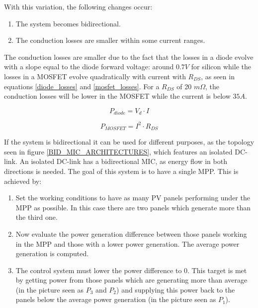 
\noindent With this variation, the following changes occur:
		
\begin{enumerate}
	\item The system becomes bidirectional.
	\item The conduction losses are smaller within some current ranges. 
\end{enumerate}

The conduction losses are smaller due to the fact that the losses in a diode evolve with a slope equal to the diode forward voltage: around $0.7V$ for silicon while the losses in a MOSFET evolve quadratically with current with $R_{DS}$, as seen in equations \ref{diode_losses} and \ref{mosfet_losses}. For a $R_{DS}$ of 20 $m\Omega$, the conduction losses will be lower in the MOSFET while the current is below $35 A$. 

\begin{equation}	\label{diode_losses}
	P_{diode} = V_d \cdot I
\end{equation}
	
\begin{equation}	\label{mosfet_losses}
	P_{MOSFET} = I^2 \cdot R_{DS}
\end{equation}


If the system is bidirectional it can be used for different purposes, as the topology seen in figure \ref{BID_MIC_ARCHITECTURES}, which features an isolated DC-link. 
An isolated DC-link has a bidirectional MIC, as energy flow in both directions is needed. The goal of this system is to have a single MPP. This is achieved by:

\begin{enumerate}
	\item Set the working conditions to have as many PV  panels performing under the MPP as possible. In this case there are two panels which generate more than the third one.
	\item Now evaluate the power generation difference between those panels working in the MPP and those with a lower power generation. The average power generation is computed.
	\item The control system must lower the power difference to 0. This target is met by getting power from those panels which are generating more than average (in the picture seen as $P_{3}$ and $P_{2}$) and supplying this power back to the panels below the average power generation (in the picture seen as $P_{1}$).
\end{enumerate}

